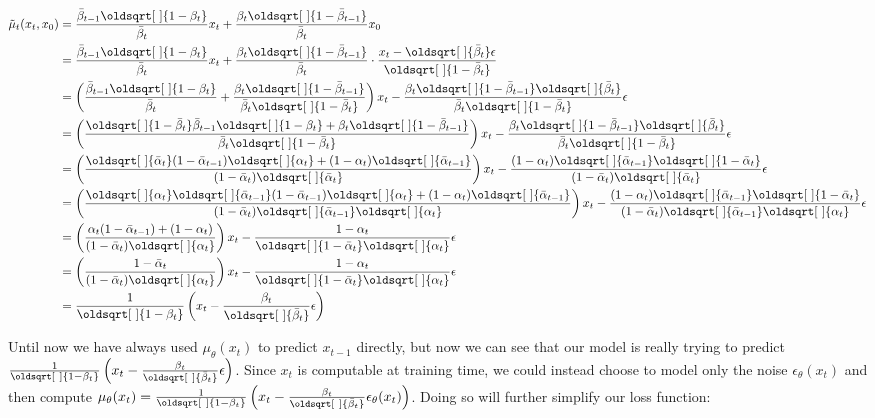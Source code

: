 \documentclass[11pt,dvipsnames]{article}
\renewcommand*{\sqrt}[2][\ ]{\oldsqrt[#1]{#2}}
\begin{document}
\begin{equation*}
\begin{split}
\tilde\mu_t(x_t, x_0) &= \frac{\bar\beta_{t-1}\sqrt{1 - \beta_t}}{\bar\beta_t} x_t + \frac{\beta_t\sqrt{1 - \bar\beta_{t-1}}}{\bar\beta_t} x_0 \\
&= \frac{\bar\beta_{t-1}\sqrt{1 - \beta_t}}{\bar\beta_t} x_t + \frac{\beta_t\sqrt{1 - \bar\beta_{t-1}}}{\bar\beta_t} \cdot \frac{x_t - \sqrt{\bar\beta_t} \epsilon}{\sqrt{1 - \bar\beta_t}} \\
&= \left( \frac{\bar\beta_{t-1}\sqrt{1 - \beta_t}}{\bar\beta_t} + \frac{\beta_t\sqrt{1 - \bar\beta_{t-1}}}{\bar\beta_t\sqrt{1 - \bar\beta_t}} \right) x_t - \frac{\beta_t\sqrt{1 - \bar\beta_{t-1}}\sqrt{\bar\beta_t}}{\bar\beta_t\sqrt{1 - \bar\beta_t}} \epsilon \\
&= \left( \frac{\sqrt{1 - \bar\beta_t} \bar\beta_{t-1}\sqrt{1 - \beta_t} + \beta_t\sqrt{1 - \bar\beta_{t-1}}}{\bar\beta_t\sqrt{1 - \bar\beta_t}} \right) x_t - \frac{\beta_t\sqrt{1 - \bar\beta_{t-1}}\sqrt{\bar\beta_t}}{\bar\beta_t\sqrt{1 - \bar\beta_t}} \epsilon \\
&= \left( \frac{\sqrt{\bar\alpha_t} (1 - \bar\alpha_{t-1}) \sqrt{\alpha_t} + (1 - \alpha_t) \sqrt{\bar\alpha_{t-1}}}{(1 - \bar\alpha_t) \sqrt{\bar\alpha_t}} \right) x_t - \frac{(1 - \alpha_t) \sqrt{\bar\alpha_{t-1}} \sqrt{1 - \bar\alpha_t}}{(1 - \bar\alpha_t)\sqrt{\bar\alpha_t}} \epsilon \\
&= \left( \frac{\sqrt{\alpha_t}\sqrt{\bar\alpha_{t-1}} (1 - \bar\alpha_{t-1}) \sqrt{\alpha_t} + (1 - \alpha_t) \sqrt{\bar\alpha_{t-1}}}{(1 - \bar\alpha_t) \sqrt{\bar\alpha_{t-1}}\sqrt{\alpha_t}} \right) x_t - \frac{(1 - \alpha_t) \sqrt{\bar\alpha_{t-1}} \sqrt{1 - \bar\alpha_t}}{(1 - \bar\alpha_t)\sqrt{\bar\alpha_{t-1}}\sqrt{\alpha_t}} \epsilon \\
&= \left( \frac{\alpha_t(1 - \bar\alpha_{t-1}) + (1 - \alpha_t)}{(1 - \bar\alpha_t) \sqrt{\alpha_t}} \right) x_t - \frac{1 - \alpha_t}{\sqrt{1 - \bar\alpha_t}\sqrt{\alpha_t}} \epsilon \\
&= \left( \frac{1 - \bar\alpha_t}{(1 - \bar\alpha_t) \sqrt{\alpha_t}} \right) x_t - \frac{1 - \alpha_t}{\sqrt{1 - \bar\alpha_t}\sqrt{\alpha_t}} \epsilon \\
&= \frac{1}{\sqrt{1 - \beta_t}} \left( x_t - \frac{\beta_t }{\sqrt{\bar\beta_t}} \epsilon \right) \\
\end{split}
\end{equation*}

Until now we have always used $\mu_\theta(x_t)$ to predict $x_{t-1}$ directly, but now we can see that our model is
really trying to predict $\frac{1}{\sqrt{1 - \beta_t}} \left( x_t - \frac{\beta_t }{\sqrt{\bar\beta_t}} \epsilon \right)$.
Since $x_t$ is computable at training time, we could instead choose to model only the noise $\epsilon_\theta(x_t)$ and then compute
$\mu_\theta(x_t) = \frac{1}{\sqrt{1 - \beta_t}} \left( x_t - \frac{\beta_t }{\sqrt{\bar\beta_t}} \epsilon_\theta(x_t) \right)$.
Doing so will further simplify our loss function:
\end{document}
